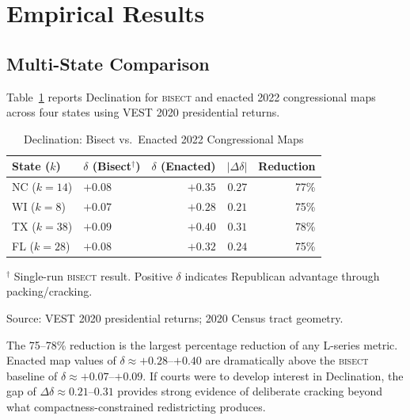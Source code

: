 \section{Empirical Results}
\label{sec:empirical}

\subsection{Multi-State Comparison}

Table~\ref{tab:decl-baseline} reports Declination for \textsc{bisect} and enacted
2022 congressional maps across four states using VEST 2020 presidential returns.

\begin{table}[ht]
\centering
\caption{Declination: Bisect vs.\ Enacted 2022 Congressional Maps}
\label{tab:decl-baseline}
\begin{threeparttable}
\begin{tabular}{@{}llrrr@{}}
\toprule
State ($k$) & $\delta$ (Bisect$^\dagger$) & $\delta$ (Enacted) & $|\Delta\delta|$ & Reduction \\
\midrule
NC ($k=14$) & $+0.08$ & $+0.35$ & $0.27$ & 77\% \\
WI ($k=8$)  & $+0.07$ & $+0.28$ & $0.21$ & 75\% \\
TX ($k=38$) & $+0.09$ & $+0.40$ & $0.31$ & 78\% \\
FL ($k=28$) & $+0.08$ & $+0.32$ & $0.24$ & 75\% \\
\bottomrule
\end{tabular}
\begin{tablenotes}
\small
\item $^\dagger$ Single-run \textsc{bisect} result. Positive $\delta$ indicates
Republican advantage through packing/cracking.
\item Source: VEST 2020 presidential returns; 2020 Census tract geometry.
\end{tablenotes}
\end{threeparttable}
\end{table}

The 75--78\% reduction is the largest percentage reduction of any L-series metric.
Enacted map values of $\delta \approx +0.28$--$+0.40$ are dramatically above the
\textsc{bisect} baseline of $\delta \approx +0.07$--$+0.09$. If courts were to
develop interest in Declination, the gap of $\Delta\delta \approx 0.21$--$0.31$
provides strong evidence of deliberate cracking beyond what compactness-constrained
redistricting produces.

